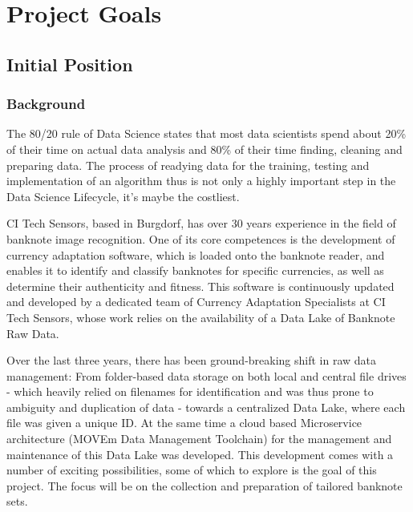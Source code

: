 \chapter{ Project Goals}
\label{chap:projectgoals}

\section{Initial Position}
\subsection{Background}
The 80/20 rule of Data Science states that most data scientists spend about 20\% of their time on actual data analysis and 80\% of their time finding, cleaning and preparing data. The process of readying data for the training, testing and implementation of an algorithm thus is not only a highly important step in the Data Science Lifecycle, it's maybe the costliest.\par
CI Tech Sensors, based in Burgdorf, has over 30 years experience in the field of banknote image recognition. One of its core competences is the development of currency adaptation software, which is loaded onto the banknote reader, and enables it to identify and classify banknotes for specific currencies, as well as determine their authenticity and fitness. This software is continuously updated and developed by a dedicated team of Currency Adaptation Specialists at CI Tech Sensors, whose work relies on the availability of a Data Lake of Banknote Raw Data. \par
Over the last three years, there has been ground-breaking shift in raw data management: From folder-based data storage on both local and central file drives -  which heavily relied on filenames for identification and was thus prone to ambiguity and duplication of data - towards a centralized Data Lake, where each file was given a unique ID. At the same time a cloud based Microservice architecture (MOVEm Data Management Toolchain) for the management and maintenance of this Data Lake was developed.
This development comes with a number of exciting possibilities, some of which to explore is the goal of this project. The focus will be on the collection and preparation of tailored banknote sets.\par

